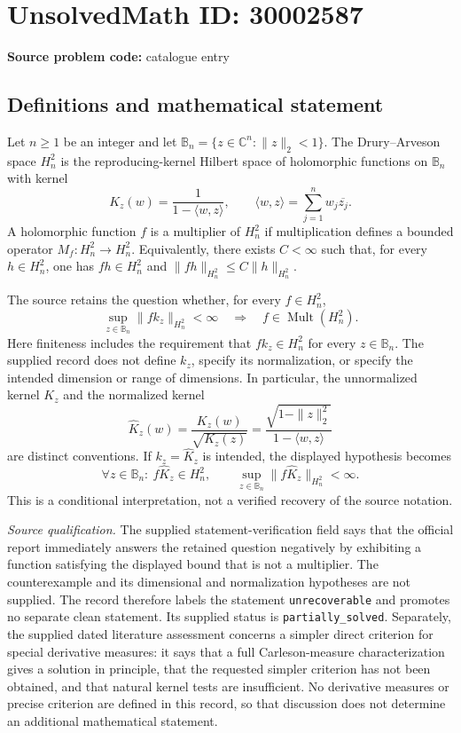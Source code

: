 \documentclass[11pt]{article}
\newcommand{\C}{\mathbb{C}}
\begin{document}
\section*{UnsolvedMath ID: 30002587}
\textbf{Source problem code:} catalogue entry
\subsection{Definitions and mathematical statement}
Let \(n\geq 1\) be an integer and let \(\mathbb B_n=\{z\in\C^n:\|z\|_2<1\}\). The Drury--Arveson space \(H_n^2\) is the reproducing-kernel Hilbert space of holomorphic functions on \(\mathbb B_n\) with kernel
\[
K_z(w)=\frac{1}{1-\langle w,z\rangle},\qquad \langle w,z\rangle=\sum_{j=1}^n w_j\overline{z_j}.
\]
A holomorphic function \(f\) is a multiplier of \(H_n^2\) if multiplication defines a bounded operator \(M_f:H_n^2\to H_n^2\). Equivalently, there exists \(C<\infty\) such that, for every \(h\in H_n^2\), one has \(fh\in H_n^2\) and \(\|fh\|_{H_n^2}\leq C\|h\|_{H_n^2}\).

The source retains the question whether, for every \(f\in H_n^2\),
\[
\sup_{z\in\mathbb B_n}\|f k_z\|_{H_n^2}<\infty
\quad\Longrightarrow\quad
f\in\operatorname{Mult}(H_n^2).
\]
Here finiteness includes the requirement that \(f k_z\in H_n^2\) for every \(z\in\mathbb B_n\). The supplied record does not define \(k_z\), specify its normalization, or specify the intended dimension or range of dimensions. In particular, the unnormalized kernel \(K_z\) and the normalized kernel
\[
\widehat K_z(w)=\frac{K_z(w)}{\sqrt{K_z(z)}}=\frac{\sqrt{1-\|z\|_2^2}}{1-\langle w,z\rangle}
\]
are distinct conventions. If \(k_z=\widehat K_z\) is intended, the displayed hypothesis becomes
\[
\forall z\in\mathbb B_n:\ f\widehat K_z\in H_n^2,
\qquad
\sup_{z\in\mathbb B_n}\|f\widehat K_z\|_{H_n^2}<\infty.
\]
This is a conditional interpretation, not a verified recovery of the source notation.

\emph{Source qualification.} The supplied statement-verification field says that the official report immediately answers the retained question negatively by exhibiting a function satisfying the displayed bound that is not a multiplier. The counterexample and its dimensional and normalization hypotheses are not supplied. The record therefore labels the statement \texttt{unrecoverable} and promotes no separate clean statement. Its supplied status is \texttt{partially\_solved}. Separately, the supplied dated literature assessment concerns a simpler direct criterion for special derivative measures: it says that a full Carleson-measure characterization gives a solution in principle, that the requested simpler criterion has not been obtained, and that natural kernel tests are insufficient. No derivative measures or precise criterion are defined in this record, so that discussion does not determine an additional mathematical statement.
\end{document}

